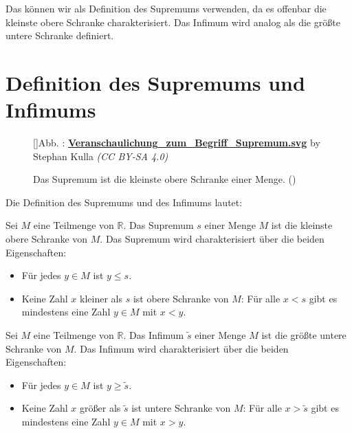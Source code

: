 \documentclass[fontsize=9pt,
               parskip=half-,
               DIV=14,
               listof=chapterentry,
               tocflat]{scrbook}
\newcounter{imagelabel}
\begin{document}
Das können wir als Definition des Supremums verwenden, da es offenbar die kleinste obere Schranke charakterisiert. Das Infimum wird analog als die größte untere Schranke definiert. 

\section{Definition des Supremums und Infimums}

\begin{figure}[h]
\vspace{\baselineskip}
[]{Abb. : \protect\href{https://commons.wikimedia.org/wiki/File:Veranschaulichung_zum_Begriff_Supremum.svg}{\textbf{Veranschaulichung\allowbreak\_zum\allowbreak\_Begriff\allowbreak\_Supremum.svg}} by Stephan Kulla \textit{(CC BY-SA 4.0)}}\centering
{}
\caption*{Das Supremum ist die kleinste obere Schranke einer Menge. ()}
\end{figure}
Die Definition des Supremums und des Infimums lautet:

\begin{definition*}[Supremum]
Sei $M$ eine Teilmenge von $\mathbb {R} $. Das Supremum $s$ einer Menge $M$ ist die kleinste obere Schranke von $M$. Das Supremum wird charakterisiert über die beiden Eigenschaften:

\begin{itemize}
\item Für jedes $y\in M$ ist $y\leq s$.
\item Keine Zahl $x$ kleiner als $s$ ist obere Schranke von $M$: Für alle $x<s$ gibt es mindestens eine Zahl $y\in M$ mit $x<y$.
\end{itemize}

\end{definition*}

\begin{definition*}[Infimum]
Sei $M$ eine Teilmenge von $\mathbb {R} $. Das Infimum ${\tilde {s}}$ einer Menge $M$ ist die größte untere Schranke von $M$. Das Infimum wird charakterisiert über die beiden Eigenschaften:

\begin{itemize}
\item Für jedes $y\in M$ ist $y\geq {\tilde {s}}$.
\item Keine Zahl $x$ größer als ${\tilde {s}}$ ist untere Schranke von $M$: Für alle $x>{\tilde {s}}$ gibt es mindestens eine Zahl $y\in M$ mit $x>y$.
\end{itemize}

\end{definition*}
\end{document}
